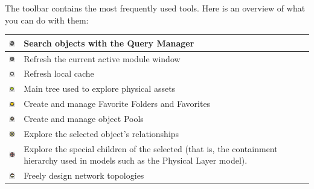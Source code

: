 \documentclass[a4paper]{article}
\begin{document}
	The toolbar contains the most frequently used tools. Here is an overview of what you can do with them:
	\begin{table}[h!]
		\centering
		\begin{tabular}{cl}
			\includegraphics[width=0.5cm]{img/icon_query_manager.png} & Search objects with the Query Manager\\
			\midrule
			\includegraphics[width=0.5cm]{img/icon_refresh_component.png} & Refresh the current active module window\\
			\midrule
			\includegraphics[width=0.5cm]{img/icon_refresh_cache.png} & Refresh local cache\\
			\midrule
			\includegraphics[width=0.5cm]{img/icon_navigation_tree.png} & Main tree used to explore physical assets\\
			\midrule
			\includegraphics[width=0.5cm]{img/icon_bookmarks.png} & Create and manage Favorite Folders and Favorites\\
			\midrule
			\includegraphics[width=0.5cm]{img/icon_pools_manager.png} & Create and manage object Pools\\
			\midrule
			\includegraphics[width=0.5cm]{img/icon_relationship_explorer.png} & Explore the selected object's relationships\\
			\midrule
			\includegraphics[width=0.5cm]{img/icon_special_children_explorer.png} & Explore the special children of the selected (that is, the containment hierarchy used in models such as the Physical Layer model).\\
			\midrule
			\includegraphics[width=0.5cm]{img/icon_topology_designer.png} & Freely design network topologies\\

\end{tabular}
\end{table}
\end{document}
